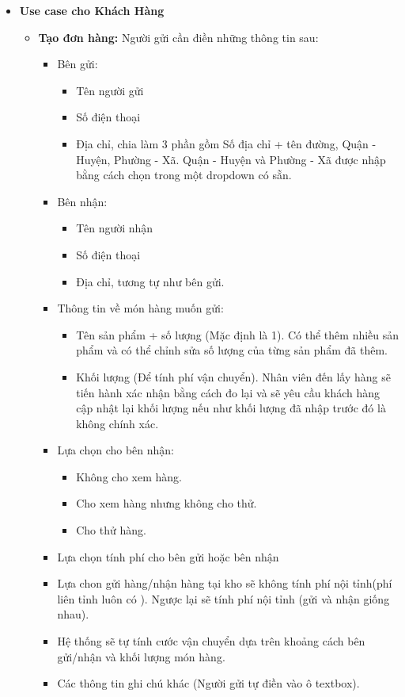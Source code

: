 	\begin{itemize}
		\item \textbf{Use case cho Khách Hàng}
		\begin{itemize}
			\item \textbf{Tạo đơn hàng:} Người gửi cần điền những thông tin sau: 
			\begin{itemize}
				\item Bên gửi:
				\begin{itemize}
					\item Tên người gửi
					\item Số điện thoại
					\item Địa chỉ, chia làm 3 phần gồm Số địa chỉ + tên đường, Quận - Huyện, Phường - Xã. Quận - Huyện và Phường - Xã được nhập bằng cách chọn trong một dropdown có sẵn.
				\end{itemize}
				\item Bên nhận:
				\begin{itemize}
					\item Tên người nhận
					\item Số điện thoại
					\item Địa chỉ, tương tự như bên gửi.
				\end{itemize}
				\item Thông tin về món hàng muốn gửi:
				\begin{itemize}
					\item Tên sản phẩm + số lượng (Mặc định là 1). Có thể thêm nhiều sản phẩm và có thể chỉnh sửa số lượng của từng sản phẩm đã thêm.
					\item Khối lượng (Để tính phí vận chuyển). Nhân viên đến lấy hàng sẽ tiến hành xác nhận bằng cách đo lại và sẽ yêu cầu khách hàng cập nhật lại khối lượng nếu như khối lượng đã nhập trước đó là không chính xác.
					
				\end{itemize}
				\item Lựa chọn cho bên nhận:
				\begin{itemize}
					\item Không cho xem hàng.
					\item Cho xem hàng nhưng không cho thử.
					\item Cho thử hàng.
				\end{itemize}
				\item Lựa chọn tính phí cho bên gửi hoặc bên nhận 
				\item Lựa chon gửi hàng/nhận hàng tại kho sẽ không tính phí nội tỉnh(phí liên tỉnh luôn có ). Ngược lại sẽ tính phí nội tỉnh (gửi và nhận giống nhau). 
				\item Hệ thống sẽ tự tính cước vận chuyển dựa trên khoảng cách bên gửi/nhận và khối lượng món hàng.
				\item Các thông tin ghi chú khác (Người gửi tự điền vào ô textbox).
			\end{itemize} 
				

\end{itemize}
\end{itemize}
